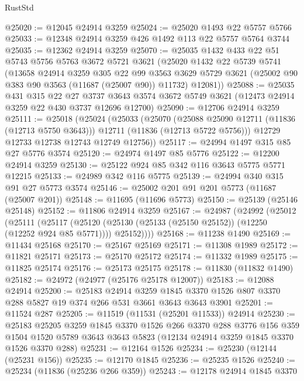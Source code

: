 \begin{lexlean}{RustStd}
\begin{coremodule}
@25020 := @12045 @24914 @3259
@25024 := @25020 @1493 @22 @5757 @5766
@25033 := @12348 @24914 @3259 @426 @1492 @113 @22 @5757 @5764 @3744
@25035 := @12362 @24914 @3259
@25070 := @25035
    @1432
    @433
    @22
    @51
    @5743
    @5756
    @5763
    @3672
    @5721
    @3621
    (@25020
      @1432
      @22
      @5739
      @5741
      (@13658
        @24914
        @3259
        @305
        @22
        @99
        @3563
        @3629
        @5729
        @3621
        (@25002 @90 @383 @90 @3563 (@11687 (@25007 @90)) @11732)
        @12081))
@25088 := @25035
    @431
    @315
    @22
    @27
    @3737
    @3643
    @3574
    @3672
    @5749
    @3621
    (@12473 @24914 @3259 @22 @430 @3737 @12696 @12700)
@25090 := @12706 @24914 @3259
@25111 := @25018
    (@25024
      (@25033
        (@25070
          (@25088 @25090 @12711 (@11836 (@12713 @5750 @3643)))
          @12711
          (@11836 (@12713 @5722 @5756)))
        @12729
        @12733
        @12738
        @12743
        @12749
        @12756))
@25117 := @24994 @1497 @315 @85 @27 @5776 @3574
@25120 := @24974 @1497 @85 @5776
@25122 := @12200 @24914 @3259
@25130 := @25122 @924 @85 @342 @116 @3643 @5775 @5771 @12215
@25133 := @24989 @342 @116 @5775
@25139 := @24994 @340 @315 @91 @27 @5773 @3574
@25146 := @25002 @201 @91 @201 @5773 (@11687 (@25007 @201))
@25148 := @11695 (@11696 @5773)
@25150 := @25139 (@25146 @25148)
@25152 := @11806 @24914 @3259
@25167 := @24987
    (@24992
      (@25012
        (@25111
          (@25117
            (@25120 (@25130 (@25133 (@25150 @25152)) (@12250 (@12252 @924 @85 @5771))))
            @25152))))
@25168 := @11238 @1490
@25169 := @11434 @25168
@25170 := @25167 @25169
@25171 := @11308 @1989
@25172 := @11821 @25171
@25173 := @25170 @25172
@25174 := @11332 @1989
@25175 := @11825 @25174
@25176 := @25173 @25175
@25178 := @11830 (@11832 @1490)
@25182 := @24972 (@24977 (@25176 @25178 @12007))
@25183 := @12088 @24914
@25200 := @25183
    @24914
    @3259
    @1845
    @3370
    @1526
    @807
    @3370
    @288
    @5827
    @19
    @374
    @266
    @531
    @3661
    @3643
    @3643
    @3901
@25201 := @11524 @287
@25205 := @11519 (@11531 (@25201 @11533)) @24914
@25230 := @25183
    @25205
    @3259
    @1845
    @3370
    @1526
    @266
    @3370
    @288
    @3776
    @156
    @359
    @1504
    @1520
    @5789
    @3643
    @3643
    @5823
    (@12134 @24914 @3259 @1845 @3370 @1526 @3370 @288)
@25231 := @12164 @1526
@25234 := @25230 (@12144 (@25231 @156))
@25235 := @12170 @1845
@25236 := @25235 @1526
@25240 := @25234 (@11836 (@25236 @266 @359))
@25243 := @12178 @24914 @1845 @3370

\end{coremodule}
\end{lexlean}
